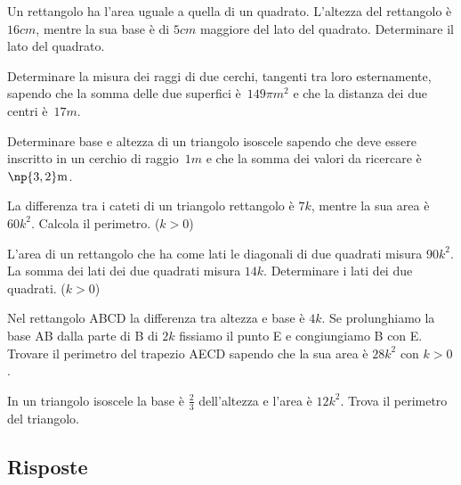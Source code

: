 \begin{multicols}{2}
\begin{esercizio}[\Ast]
 \label{ese:6.94}
Un rettangolo ha l'area uguale a quella di un quadrato. L'altezza del rettangolo è $16\unit{cm}$, mentre la sua base è di $5\unit{cm}$ maggiore del lato del quadrato. Determinare il lato del quadrato.
\end{esercizio}

\begin{esercizio}[\Ast]
 \label{ese:6.95}
Determinare la misura dei raggi di due cerchi, tangenti tra loro esternamente, sapendo che la somma delle due superfici è~$149 \pi \unit{m^{2}}$ e che la distanza dei due centri è~$17 \unit{m}$.
\end{esercizio}

\begin{esercizio}[\Ast]
 \label{ese:6.96}
Determinare base e altezza di un triangolo isoscele sapendo che deve essere inscritto in un cerchio di raggio~$1 \unit{m}$ e che la somma dei valori da ricercare è~$\np{3,2} \unit{m}$.
\end{esercizio}

\begin{esercizio}[\Ast]
 \label{ese:6.97}
La differenza tra i cateti di un triangolo rettangolo è $7k$, mentre la sua area è $60 k^2$. Calcola il perimetro. ($k>0$)
\end{esercizio}

\begin{esercizio}[\Ast]
 \label{ese:6.98}
L'area di un rettangolo che ha come lati le diagonali di due quadrati misura $90 k^2$. La somma dei lati dei due quadrati misura $14k$. Determinare i lati dei due quadrati. ($ k>0 $)
\end{esercizio}

\begin{esercizio}[\Ast]
 \label{ese:6.99}
Nel rettangolo ABCD la differenza tra altezza e base è $4k$. Se prolunghiamo la base AB dalla parte di B di $2k$ fissiamo il punto E e congiungiamo B con E. Trovare il perimetro del trapezio AECD sapendo che la sua area è $28k^2$ con $k>0$.
\end{esercizio}

\begin{esercizio}[\Ast]
 \label{ese:6.100}
In un triangolo isoscele la base è $ \frac 2 3 $ dell'altezza e l'area è $12k^2$. Trova il perimetro del triangolo.
\end{esercizio}
\end{multicols}

\subsection{Risposte}
